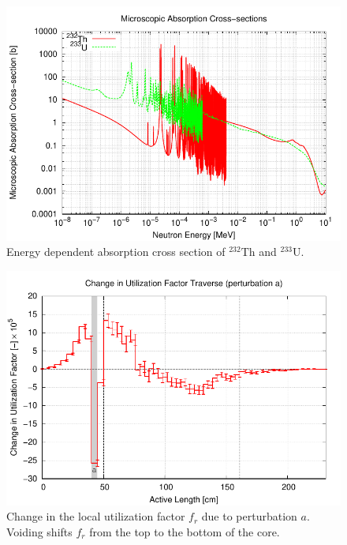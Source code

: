 \documentclass[11pt]{article}
\newcommand{\iso}[2]{$^{#2}\mathrm{#1}$}
\begin{document}
\clearpage
\begin{figure}[p]
  \centering
  \includegraphics[width=\textwidth, trim=0 0 0 0.275in, clip]{./img/XsAbsorption.pdf}
  \caption{Energy dependent absorption cross section of \iso{Th}{232} and \iso{U}{233}.}
  \label{fig:xs}
\end{figure}

\clearpage
\begin{figure}[p]
  \centering
  \includegraphics[width=\textwidth, trim=0 0 0 0.275in, clip]{./img/Th-a-TraverseDeltaEff.pdf}
  \caption{Change in the local utilization factor $f_r$ due to perturbation $a$. Voiding shifts $f_r$ from the top to the bottom of the core.}
  \label{fig:deltaEffRb}
\end{figure}
\end{document}
